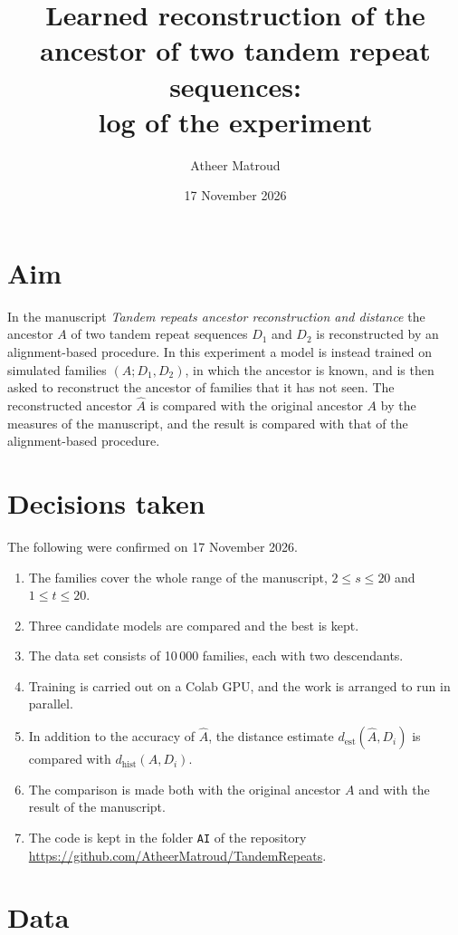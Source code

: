 \documentclass[11pt,a4paper]{article}
\title{Learned reconstruction of the ancestor of two tandem repeat sequences:\\ log of the experiment}
\author{Atheer Matroud}
\date{17 November 2026}
\newcommand{\dest}{d_{\mathrm{est}}}
\newcommand{\dhist}{d_{\mathrm{hist}}}
\newcommand{\Ahat}{\hat{A}}
\begin{document}
\maketitle

\section{Aim}

In the manuscript \emph{Tandem repeats ancestor reconstruction and distance} the ancestor $A$ of two tandem repeat sequences $D_1$ and $D_2$ is reconstructed by an alignment-based procedure. In this experiment a model is instead trained on simulated families $(A;D_1,D_2)$, in which the ancestor is known, and is then asked to reconstruct the ancestor of families that it has not seen. The reconstructed ancestor $\Ahat$ is compared with the original ancestor $A$ by the measures of the manuscript, and the result is compared with that of the alignment-based procedure.

\section{Decisions taken}

The following were confirmed on 17 November 2026.
\begin{enumerate}
\item The families cover the whole range of the manuscript, $2\le s\le 20$ and $1\le t\le 20$.
\item Three candidate models are compared and the best is kept.
\item The data set consists of 10\,000 families, each with two descendants.
\item Training is carried out on a Colab GPU, and the work is arranged to run in parallel.
\item In addition to the accuracy of $\Ahat$, the distance estimate $\dest(\Ahat,D_i)$ is compared with $\dhist(A,D_i)$.
\item The comparison is made both with the original ancestor $A$ and with the result of the manuscript.
\item The code is kept in the folder \texttt{AI} of the repository \url{https://github.com/AtheerMatroud/TandemRepeats}.
\end{enumerate}

\section{Data}
\end{document}

